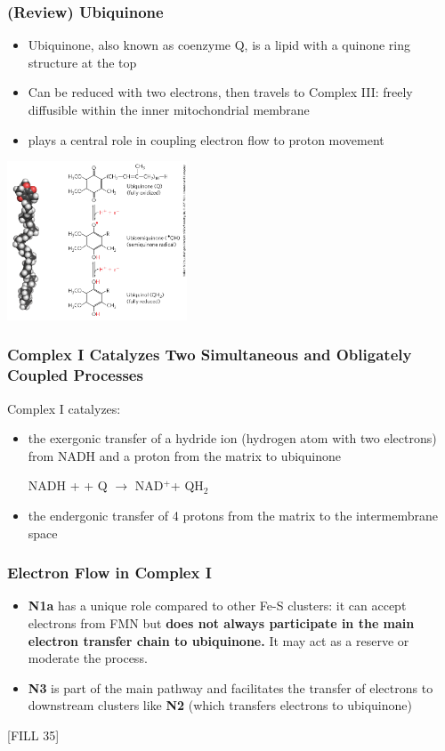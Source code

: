 \documentclass[10pt]{article}
\newcommand{\proton}{\text{H$^+$}}
\newcommand{\pc}{$^+$}
\begin{document}
\subsubsection*{(Review) Ubiquinone}
\begin{itemize}
	\item Ubiquinone, also known as coenzyme Q, is a lipid with a quinone ring structure at the top
	\item Can be reduced with two electrons, then travels to Complex III: freely diffusible within the inner mitochondrial membrane
	\item plays a central role in coupling electron flow to proton movement
\end{itemize}
\begin{center} 
	\includegraphics*[width=0.4\textwidth]{L1_7.png} 
\end{center}

\subsubsection*{Complex I Catalyzes Two Simultaneous and Obligately Coupled Processes}
Complex I catalyzes:
\begin{itemize}
	\item the exergonic transfer of a hydride ion (hydrogen atom with two electrons) from NADH and a proton from the matrix to ubiquinone
	\begin{center}
        NADH + \proton + Q $\rightarrow$ NAD\pc + QH$_2$
    \end{center}
    \item the endergonic transfer of 4 protons from the matrix to the intermembrane space
\end{itemize}

\subsubsection*{Electron Flow in Complex I}
\begin{itemize}
	\item \textbf{N1a} has a unique role compared to other Fe-S clusters: it can accept electrons from FMN but \textbf{does not always participate in the main electron transfer chain to ubiquinone.}  It may act as a reserve or moderate the process.
	\item \textbf{N3} is part of the main pathway and facilitates the transfer of electrons to downstream clusters like \textbf{N2} (which transfers electrons to ubiquinone)
\end{itemize}
\begin{center} 
	[FILL 35]
\end{center}
\end{document}
